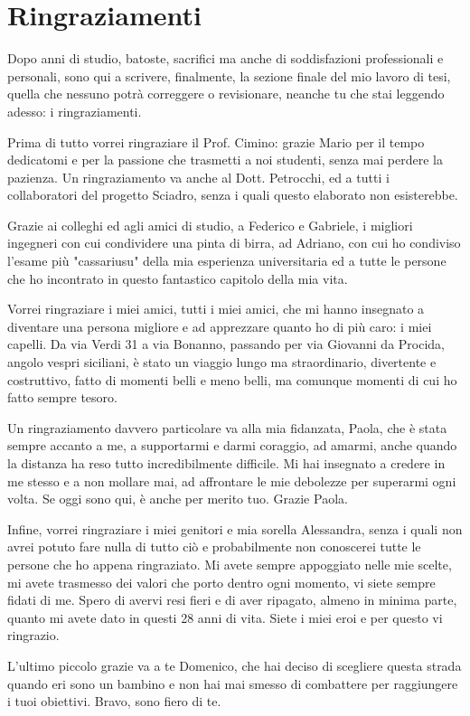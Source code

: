 \chapter*{Ringraziamenti}

Dopo anni di studio, batoste, sacrifici ma anche di soddisfazioni professionali e personali, sono qui a scrivere, finalmente, la sezione finale del mio lavoro di tesi, quella che nessuno potrà correggere o revisionare, neanche tu che stai leggendo adesso: i ringraziamenti.

Prima di tutto vorrei ringraziare il Prof. Cimino: grazie Mario per il tempo dedicatomi e per la passione che trasmetti a noi studenti, senza mai perdere la pazienza. 
Un ringraziamento va anche al Dott. Petrocchi, ed a tutti i collaboratori del progetto Sciadro, senza i quali questo elaborato non esisterebbe.

Grazie ai colleghi ed agli amici di studio, a Federico e Gabriele, i migliori ingegneri con cui condividere una pinta di birra, ad Adriano, con cui ho condiviso l'esame più "cassariusu" della mia esperienza universitaria ed a tutte le persone che ho incontrato in questo fantastico capitolo della mia vita.

Vorrei ringraziare i miei amici, tutti i miei amici, che mi hanno insegnato a diventare una persona migliore e ad apprezzare quanto ho di più caro: i miei capelli. 
Da via Verdi 31 a via Bonanno, passando per via Giovanni da Procida, angolo vespri siciliani, è stato un viaggio lungo ma straordinario, divertente e costruttivo, fatto di momenti belli e meno belli, ma comunque momenti di cui ho fatto sempre tesoro.

Un ringraziamento davvero particolare va alla mia fidanzata, Paola, che è stata sempre accanto a me, a supportarmi e darmi coraggio, ad amarmi, anche quando la distanza ha reso tutto incredibilmente difficile. 
Mi hai insegnato a credere in me stesso e a non mollare mai, ad affrontare le mie debolezze per superarmi ogni volta. 
Se oggi sono qui, è anche per merito tuo. 
Grazie Paola.

Infine, vorrei ringraziare i miei genitori e mia sorella Alessandra, senza i quali non avrei potuto fare nulla di tutto ciò e probabilmente non conoscerei tutte le persone che ho appena ringraziato. 
Mi avete sempre appoggiato nelle mie scelte, mi avete trasmesso dei valori che porto dentro ogni momento, vi siete sempre fidati di me. 
Spero di avervi resi fieri e di aver ripagato, almeno in minima parte, quanto mi avete dato in questi 28 anni di vita. 
Siete i miei eroi e per questo vi ringrazio.

L'ultimo piccolo grazie va a te Domenico, che hai deciso di scegliere questa strada quando eri sono un bambino e non hai mai smesso di combattere per raggiungere i tuoi obiettivi. 
Bravo, sono fiero di te.